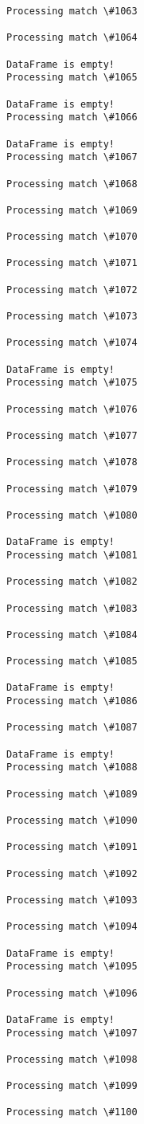 \documentclass[11pt]{article}
\begin{document}
\begin{Verbatim}[commandchars=\\\{\}]
Processing match \#1063

Processing match \#1064

DataFrame is empty!
Processing match \#1065

DataFrame is empty!
Processing match \#1066

DataFrame is empty!
Processing match \#1067

Processing match \#1068

Processing match \#1069

Processing match \#1070

Processing match \#1071

Processing match \#1072

Processing match \#1073

Processing match \#1074

DataFrame is empty!
Processing match \#1075

Processing match \#1076

Processing match \#1077

Processing match \#1078

Processing match \#1079

Processing match \#1080

DataFrame is empty!
Processing match \#1081

Processing match \#1082

Processing match \#1083

Processing match \#1084

Processing match \#1085

DataFrame is empty!
Processing match \#1086

Processing match \#1087

DataFrame is empty!
Processing match \#1088

Processing match \#1089

Processing match \#1090

Processing match \#1091

Processing match \#1092

Processing match \#1093

Processing match \#1094

DataFrame is empty!
Processing match \#1095

Processing match \#1096

DataFrame is empty!
Processing match \#1097

Processing match \#1098

Processing match \#1099

Processing match \#1100


\end{Verbatim}
\end{document}
